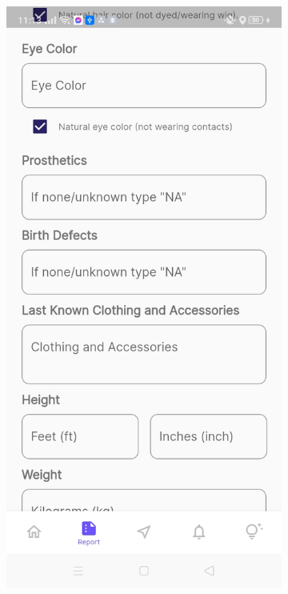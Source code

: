 \begin{figure}[!h]
\begin{subfigure}[c]{0.30\linewidth}
    \end{subfigure}
    \centering
    \begin{subfigure}[c]{0.30\linewidth}
        \centering
        \includegraphics[scale=0.15]{figures/Chapter4/Main/p4-2.jpg}

\end{subfigure}
\end{figure}
